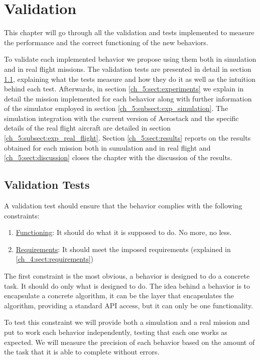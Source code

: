 \chapter{Validation} \label{ch_5:chapter}

  This chapter will go through all the validation and tests implemented to measure the performance and the correct functioning of the new behaviors. 

  To validate each implemented behavior we propose using them both in simulation and in real flight missions. The validation tests are presented in detail in section \ref{ch_5:sect:val_tests}, explaining what the tests measure and how they do it as well as the intuition behind each test. Afterwards, in section \ref{ch_5:sect:experiments} we explain in detail the mission implemented for each behavior along with further information of the simulator employed in section \ref{ch_5:subsect:exp_simulation}. The simulation integration with the current version of Aerostack and the specific details of the real flight aircraft are detailed in section \ref{ch_5:subsect:exp_real_flight}. Section \ref{ch_5:sect:results} reports on the results obtained for each mission both in sumulation and in real flight and \ref{ch_5:sect:discussion} closes the chapter with the discussion of the results.
 
\section{Validation Tests} \label{ch_5:sect:val_tests}

  A validation test should ensure that the behavior complies with the following constraints:

  \begin{enumerate}
    \item \underline{Functioning}: It should do what it is supposed to do. No more, no less.
    \item \underline{Requirements}: It should meet the imposed requirements (explained in \ref{ch_4:sect:requirements})
  \end{enumerate}

  The first constraint is the most obvious, a behavior is designed to do a concrete task. It should do only what is designed to do. The idea behind a behavior is to encapsulate a concrete algorithm, it can be the layer that encapsulates the algorithm, providing a standard API access, but it can only be one functionality.

  To test this constraint we will provide both a simulation and a real mission and put to work each behavior independently, testing that each one works as expected. We will measure the precision of each behavior based on the amount of the task that it is able to complete without errors.

